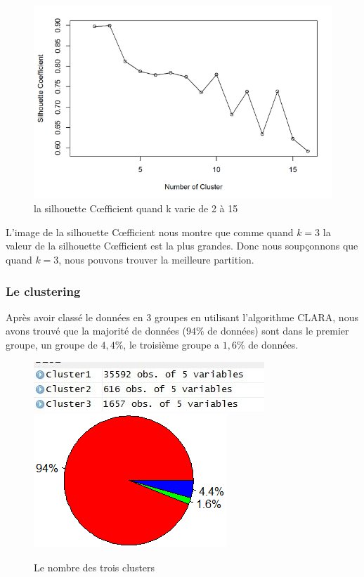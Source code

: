 \begin{figure}[H]
\centering
\includegraphics[width=0.9\linewidth]{images/sc}
\caption{la silhouette C\oe fficient quand k varie de 2 à 15}
\label{fig:sc}
\end{figure}

L'image de la silhouette C\oe fficient nous montre que comme quand $k=3$ la valeur de la silhouette C\oe fficient est la plus grandes. Donc nous soupçonnons que quand $k=3$, nous pouvons trouver la meilleure partition.

\subsubsection{Le clustering}
Après avoir classé le données en 3 groupes en utilisant l'algorithme CLARA, nous avons trouvé que la majorité de données ($94 \%$ de données) sont dans le premier groupe, un groupe de $4,4 \%$, le troisième groupe a $1,6 \%$ de données.  

 \begin{figure}[H]
 	\flushleft
 	 \includegraphics[width=0.45\linewidth]{images/3cluster}
 	 \label{fig:3cluster}
 	\hspace{1in}	 
 	\includegraphics[width=0.325\linewidth]{images/piechart}
 	\label{fig:piechart}
 	\caption{Le nombre des trois clusters} 
 \end{figure}

